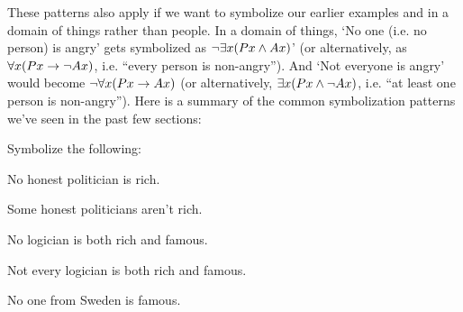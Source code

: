 These patterns also apply if we want to symbolize our earlier examples  and  in a domain of things rather than people.  In a domain of things, `No one (i.e. no person) is angry' gets symbolized as $\neg \exists x(Px \wedge Ax)$' (or alternatively, as $\forall x(Px \rightarrow \neg Ax)$, i.e. ``every person is non-angry'').  And `Not everyone is angry' would become $\neg \forall x(Px \rightarrow Ax)$ (or alternatively, $\exists x(Px \wedge \neg Ax)$, i.e. ``at least one person is non-angry'').   Here is a summary of the common symbolization patterns we've seen in the past few sections:



\practiceproblems
\problempart Symbolize the following: 

\begin{earg}

\item No honest politician is rich.

\item Some honest politicians aren't rich.

\item No logician is both rich and famous.

\item Not every logician is both rich and famous.

\item No one from Sweden is famous.

\end{earg}



